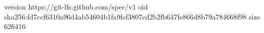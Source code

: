 version https://git-lfs.github.com/spec/v1
oid sha256:fd7ccf6310a96d4ab54604b1fa9fcf3807cd2b2fb647fe866d8b79a784668f98
size 626416
